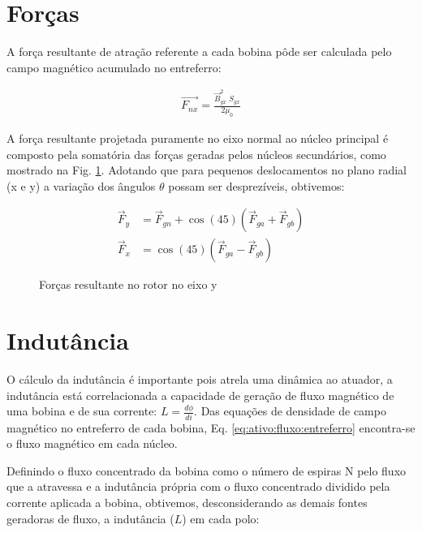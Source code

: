 \section{Forças}

A força resultante de atração referente a cada bobina pôde ser calculada pelo campo magnético acumulado no entreferro:

\begin{align}
	\vec{F_{nx}} = \frac{\vec{B}_{gx}^2 \; S_{gx}}{2 \mu_0} 
\end{align}

A força resultante projetada puramente no eixo normal ao núcleo principal é composto pela somatória das forças geradas pelos núcleos secundários, como mostrado na Fig. \ref{Fig:modelo:circuito:ativo:forcas}. Adotando que para pequenos deslocamentos no plano radial (x e y) a variação dos ângulos $\theta$ possam ser desprezíveis, obtivemos:

\begin{align}
\vec{F}_y &= \vec{F}_{gn} + \cos(45) (\vec{F}_{ga} + \vec{F}_{gb}) \label{eq:ativo:F:resultante:y} \\
\vec{F}_x &= \cos(45) (\vec{F}_{ga} - \vec{F}_{gb})  \label{eq:ativo:F:resultante:x}
\end{align}

\begin{figure}[!ht]
	\centering
	\def\svgwidth{0.8\columnwidth}
	
		\caption{Forças resultante no rotor no eixo y}
		\label{Fig:modelo:circuito:ativo:forcas}
\end{figure} 


\section{Indutância} \label{subsec:at:indutancia}

O cálculo da indutância é importante pois atrela uma dinâmica ao atuador, a indutância está correlacionada a capacidade de geração de fluxo magnético de uma bobina e de sua corrente: $L = \frac {d\phi}{di}$. Das equações de densidade de campo magnético no entreferro de cada bobina, Eq. \eqref{eq:ativo:fluxo:entreferro} encontra-se o fluxo magnético em cada núcleo.

Definindo o fluxo concentrado da bobina como o número de espiras N pelo fluxo que a atravessa e a indutância própria com o fluxo concentrado dividido pela corrente aplicada a bobina, obtivemos, desconsiderando as demais fontes geradoras de fluxo, a indutância ($L$) em cada polo:

